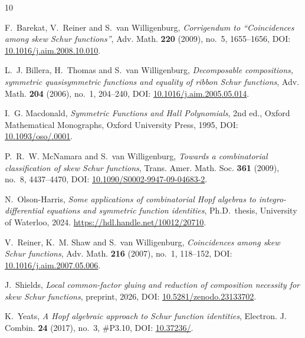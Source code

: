 \documentclass[11pt,a4paper]{amsart}
\numberwithin{equation}{section}
\theoremstyle{plain}
\theoremstyle{definition}
\begin{document}
\begin{thebibliography}{10}

F.~Barekat, V.~Reiner and S.~van Willigenburg,
\emph{Corrigendum to ``Coincidences among skew Schur functions''},
Adv. Math. \textbf{220} (2009), no.~5, 1655--1656,
DOI: \href{https://doi.org/10.1016/j.aim.2008.10.010}{10.1016/\allowbreak j.aim.2008.10.010}.

L.~J. Billera, H.~Thomas and S.~van Willigenburg,
\emph{Decomposable compositions, symmetric quasisymmetric functions and equality of ribbon Schur functions},
Adv. Math. \textbf{204} (2006), no.~1, 204--240,
DOI: \href{https://doi.org/10.1016/j.aim.2005.05.014}{10.1016/\allowbreak j.aim.2005.05.014}.

I.~G. Macdonald,
\emph{Symmetric Functions and Hall Polynomials}, 2nd ed.,
Oxford Mathematical Monographs, Oxford University Press, 1995,
DOI: \href{https://doi.org/10.1093/oso/9780198534891.001.0001}{10.1093/\allowbreak oso/.0001}.

P.~R.~W. McNamara and S.~van Willigenburg,
\emph{Towards a combinatorial classification of skew Schur functions},
Trans. Amer. Math. Soc. \textbf{361} (2009), no.~8, 4437--4470,
DOI: \href{https://doi.org/10.1090/S0002-9947-09-04683-2}{10.1090/\allowbreak S0002-9947-09-04683-2}.

N.~Olson-Harris,
\emph{Some applications of combinatorial Hopf algebras to integro-differential equations and symmetric function identities},
Ph.D.\ thesis, University of Waterloo, 2024.
\url{https://hdl.handle.net/10012/20710}.

V.~Reiner, K.~M. Shaw and S.~van Willigenburg,
\emph{Coincidences among skew Schur functions},
Adv. Math. \textbf{216} (2007), no.~1, 118--152,
DOI: \href{https://doi.org/10.1016/j.aim.2007.05.006}{10.1016/\allowbreak j.aim.2007.05.006}.

J.~Shields,
\emph{Local common-factor gluing and reduction of composition necessity for skew Schur functions},
preprint, 2026,
DOI: \href{https://doi.org/10.5281/zenodo.23133702}{10.5281/\allowbreak zenodo.23133702}.

K.~Yeats,
\emph{A Hopf algebraic approach to Schur function identities},
Electron. J. Combin. \textbf{24} (2017), no.~3, \#P3.10,
DOI: \href{https://doi.org/10.37236/5741}{10.37236/}.

\end{thebibliography}
\end{document}

